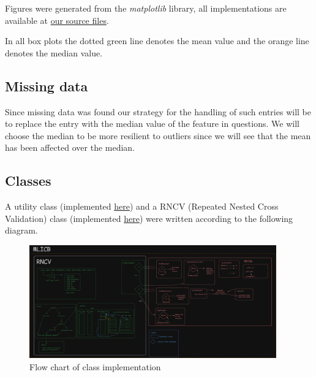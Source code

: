\documentclass[12pt, a4paper]{article}
\begin{document}
\begin{multicols}{2}
    Figures were generated from the \textit{matplotlib} \cite{noauthor_matplotlib_nodate} library, all implementations are available at \href{https://github.com/ArisPodotas/Assignment-2-MLICB}{our source files}.
    \newline

    In all box plots the dotted green line denotes the mean value and the orange line denotes the median value.
    \newline

    \subsection{Missing data} \label{subsec:missing}

    Since missing data was found our strategy for the handling of such entries will be to replace the entry with the median value of the feature in questions. We will choose the median to be more resilient to outliers since we will see that the mean has been affected over the median.
    \newline

    \subsection{Classes} \label{subsec:class}

    A utility class (implemented \href{https://github.com/ArisPodotas/Assignment-2-MLICB/blob/master/src/utils.py}{here}) and a RNCV (Repeated Nested Cross Validation) class (implemented \href{https://github.com/ArisPodotas/Assignment-2-MLICB/blob/master/src/classes.py}{here}) were written according to the following diagram.
    \newline

\end{multicols}

    \begin{figure}[H]
        \begin{center}
            \includegraphics[width=0.95\textwidth]{figures/rcv.png}
        \end{center}
        \caption{Flow chart of class implementation}\label{fig:class outline}
    \end{figure}
\end{document}
